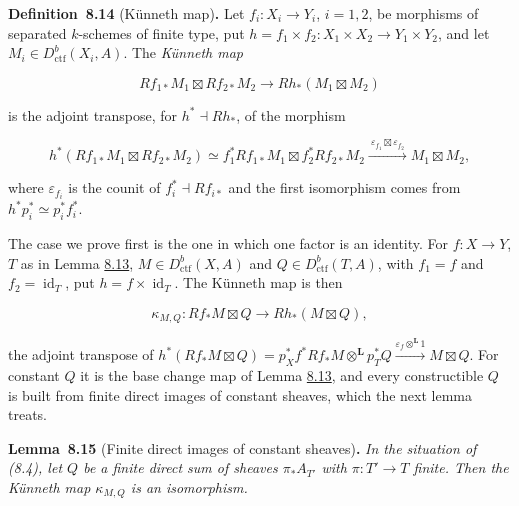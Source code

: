\documentclass[11pt]{article}
\newenvironment{bpstatement}[2]{\par\addvspace{0.6\baselineskip}\noindent\textbf{#1}#2\textbf{.}\enspace\ignorespaces}
  {\par\addvspace{0.4\baselineskip}}
\newenvironment{bpstatementit}[2]{\begin{bpstatement}{#1}{#2}\itshape\ignorespaces}{\end{bpstatement}}
\begin{document}
\label{bp690}%
\begin{bpstatement}{Definition~8.14}{ (Künneth map)}
Let \(f_i:X_i\to Y_i\), \(i=1,2\), be morphisms of separated \(k\)-schemes of finite type, put \(h=f_1\times f_2:X_1\times X_2\to Y_1\times Y_2\), and let \(M_i\in D^b_{\mathrm{ctf}}(X_i,A)\). The \emph{Künneth map}

\[
Rf_{1*}M_1\boxtimes Rf_{2*}M_2
\longrightarrow Rh_*(M_1\boxtimes M_2)
\tag{8.3}
\]

is the adjoint transpose, for \(h^*\dashv Rh_*\), of the morphism

\[
h^*(Rf_{1*}M_1\boxtimes Rf_{2*}M_2)
\simeq f_1^*Rf_{1*}M_1\boxtimes f_2^*Rf_{2*}M_2
\xrightarrow{\ \varepsilon_{f_1}\boxtimes\varepsilon_{f_2}\ }
M_1\boxtimes M_2,
\]

where \(\varepsilon_{f_i}\) is the counit of \(f_i^*\dashv Rf_{i*}\) and the first isomorphism comes from \(h^*p_i^*\simeq p_i^*f_i^*\).
\end{bpstatement}

\label{bp691}%
The case we prove first is the one in which one factor is an identity. For \(f:X\to Y\), \(T\) as in Lemma \hyperref[bp687]{8.13}, \(M\in D^b_{\mathrm{ctf}}(X,A)\) and \(Q\in D^b_{\mathrm{ctf}}(T,A)\), with \(f_1=f\) and \(f_2=\operatorname{id}_T\), put \(h=f\times\operatorname{id}_T\). The Künneth map is then

\[
\kappa_{M,Q}:Rf_*M\boxtimes Q
\longrightarrow Rh_*(M\boxtimes Q),
\tag{8.4}
\]

the adjoint transpose of \(h^*(Rf_*M\boxtimes Q)=p_X^*f^*Rf_*M\otimes^{\mathbf L} p_T^*Q
\xrightarrow{\varepsilon_f\otimes^{\mathbf L}1}M\boxtimes Q\). For constant \(Q\) it is the base change map of Lemma \hyperref[bp687]{8.13}, and every constructible \(Q\) is built from finite direct images of constant sheaves, which the next lemma treats.

\label{bp692}%
\begin{bpstatementit}{Lemma~8.15}{ (Finite direct images of constant sheaves)}
In the situation of (8.4), let \(Q\) be a finite direct sum of sheaves \(\pi_*A_{T'}\) with \(\pi:T'\to T\) finite. Then the Künneth map \(\kappa_{M,Q}\) is an isomorphism.
\end{bpstatementit}
\end{document}
